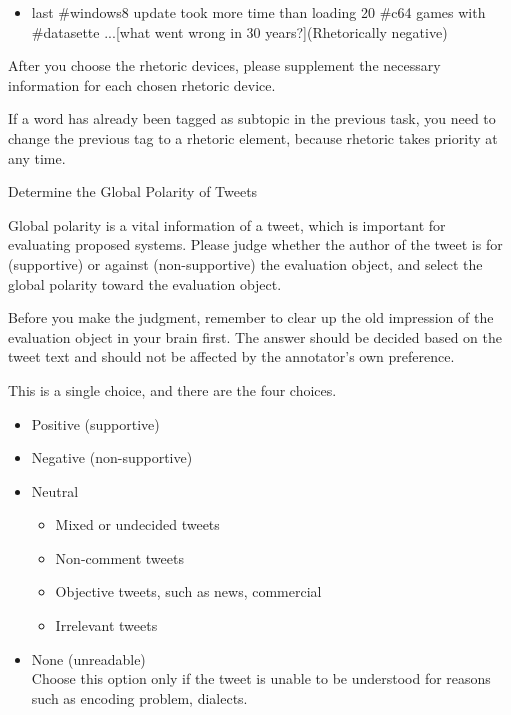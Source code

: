 \documentclass[english]{jnlp_1.4}
\begin{document}
\begin{enumerate}
\begin{itemize}
		\begin{itemize}
			\item[\CheckedBox] {\sf last \#windows8 update took more time than loading 20 \#c64 games with \#datasette ...{\boldsf [}what went wrong in 30 years?{\boldsf ](Rhetorically negative)}}
		\end{itemize}
	\end{itemize}
	\noindent After you choose the rhetoric devices, please supplement the necessary information for each chosen rhetoric device.
	
	\noindent If a word has already been tagged as subtopic in the previous task, you need to change the previous tag to a rhetoric element, because rhetoric takes priority at any time.
	
	
	{\bf \item Determine the Global Polarity of Tweets}

	\noindent Global polarity is a vital information of a tweet, which is important for evaluating proposed systems. Please judge whether the author of the tweet is for (supportive) or against (non-supportive) the evaluation object, and 				 select the global polarity toward the evaluation object. 

	\noindent Before you make the judgment, remember to clear up the old impression of the evaluation object in your brain first. The answer should be decided based on the tweet text and should not be affected by the annotator's own preference.

\vspace{1\Cvs}
	\noindent This is a single choice, and there are the four choices.
	\begin{itemize}
		\item Positive (supportive)
		\item Negative (non-supportive)
		\item Neutral
		\begin{itemize}
		\renewcommand{\labelitemii}{}
			\item Mixed or undecided tweets
			\item Non-comment tweets
			\item Objective tweets, such as news, commercial
			\item Irrelevant tweets
		\end{itemize}
		\item None (unreadable)\\
		Choose this option only if the tweet is unable to be understood for reasons such as encoding problem, dialects. 
	\end{itemize}
	

\end{enumerate}
\end{document}
